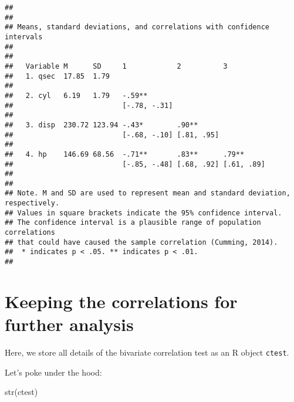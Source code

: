 \documentclass[
]{book}
\newenvironment{Shaded}{\begin{snugshade}}{\end{snugshade}}
\newcommand{\FunctionTok}[1]{\textcolor[rgb]{0.00,0.00,0.00}{#1}}
\newcommand{\NormalTok}[1]{#1}
\newcommand{\OtherTok}[1]{\textcolor[rgb]{0.56,0.35,0.01}{#1}}
\newcommand{\SpecialCharTok}[1]{\textcolor[rgb]{0.00,0.00,0.00}{#1}}
\begin{document}
\begin{verbatim}
## 
## 
## Means, standard deviations, and correlations with confidence intervals
##  
## 
##   Variable M      SD     1            2          3         
##   1. qsec  17.85  1.79                                     
##                                                            
##   2. cyl   6.19   1.79   -.59**                            
##                          [-.78, -.31]                      
##                                                            
##   3. disp  230.72 123.94 -.43*        .90**                
##                          [-.68, -.10] [.81, .95]           
##                                                            
##   4. hp    146.69 68.56  -.71**       .83**      .79**     
##                          [-.85, -.48] [.68, .92] [.61, .89]
##                                                            
## 
## Note. M and SD are used to represent mean and standard deviation, respectively.
## Values in square brackets indicate the 95% confidence interval.
## The confidence interval is a plausible range of population correlations 
## that could have caused the sample correlation (Cumming, 2014).
##  * indicates p < .05. ** indicates p < .01.
## 
\end{verbatim}

\hypertarget{keeping-the-correlations-for-further-analysis}{%
\section{Keeping the correlations for further analysis}\label{keeping-the-correlations-for-further-analysis}}

Here, we store all details of the bivariate correlation test as an R object \texttt{ctest}.

\begin{Shaded}
\end{Shaded}

Let's poke under the hood:

\begin{Shaded}
\begin{Highlighting}[]
\FunctionTok{str}\NormalTok{(ctest)}
\end{Highlighting}
\end{Shaded}
\end{document}
